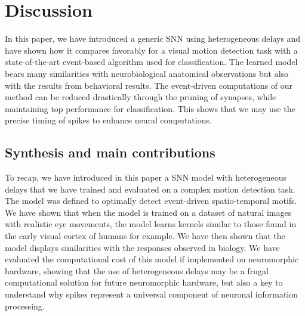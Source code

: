 \documentclass[default]{sn-jnl}%
\theoremstyle{thmstyleone}%
\theoremstyle{thmstyletwo}%
\theoremstyle{thmstylethree}%
\newcommand{\note}[1]{{\sethlcolor{yellow}\hl{#1}}}
\begin{document}
%
\section{Discussion}
In this paper, we have introduced a generic SNN using heterogeneous delays and have shown how it compares favorably for a visual motion detection task with a state-of-the-art event-based algorithm used for classification. The learned model bears many similarities with neurobiological anatomical observations but also with the results from behavioral results. %
The event-driven computations of our method can be reduced drastically through the pruning of synapses, while maintaining top performance for classification. This shows that we may use the precise timing of spikes to enhance neural computations. 
%
\subsection{Synthesis and main contributions}
To recap, we have introduced in this paper a SNN model with heterogeneous delays that we have trained and evaluated on a complex motion detection task. The model was defined to optimally detect event-driven spatio-temporal motifs. We have shown that when the model is trained on a dataset of natural images with realistic eye movements, the model learns kernels similar to those found in the early visual cortex of humans for example. We have then shown that the model displays similarities with the responses observed in biology. We have evaluated the computational cost of this model if implemented on neuromorphic hardware, showing that the use of heterogeneous delays may be a frugal computational solution for future neuromorphic hardware, but also a key to understand why spikes represent a universal component of neuronal information processing.
\end{document}
